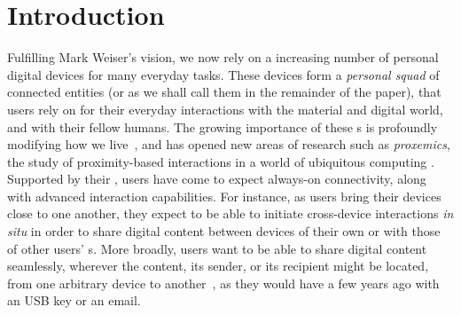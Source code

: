 
\section{Introduction}


Fulfilling Mark Weiser's vision, we now rely on a increasing number of personal digital devices for many everyday tasks. These devices form a \textit{personal squad} of connected entities (or \emph{\squad} as we shall call them in the remainder of the
paper), that users rely on for their everyday interactions with the material and digital world, and with their fellow humans.
The growing importance of these \squad{}s is profoundly modifying how we live~\cite{Dearman:2008, Oh:2017, Sohn:2008,Harper08}, and has opened new areas of research such as \textit{proxemics}, the study of proximity-based interactions in a world of ubiquitous computing
\cite{Marquardt:2011}.
Supported by their \squad, users
have come to expect always-on connectivity, along with advanced interaction
capabilities. For instance, as users bring
their devices close to one another, they expect to be able to initiate cross-device
interactions \textit{in situ} in order to share digital content
\cite{Oh:2017} between devices of their own \squad or with those of other users' \squad{}s. More broadly, users want to be able to share digital content seamlessly,
wherever the content, its sender, or its recipient might be located, from one
arbitrary device to another~\cite{Dearman:2008}, as they
would have a few years ago with an USB key or an email. 

